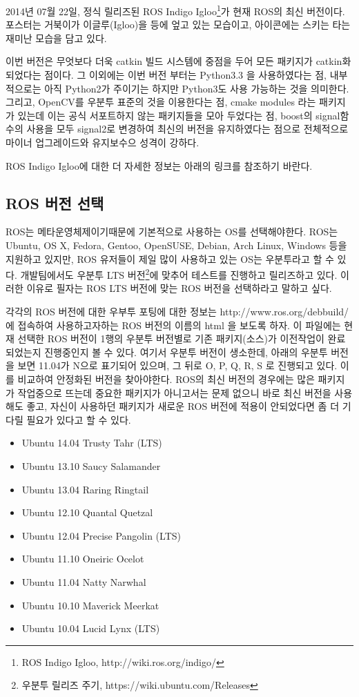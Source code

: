 2014년 07월 22일, 정식 릴리즈된 ROS Indigo Igloo\footnote{ROS Indigo Igloo, http://wiki.ros.org/indigo/}가 현재 ROS의 최신 버전이다. 포스터는 거북이가 이글루(Igloo)을 등에 엎고 있는 모습이고, 아이콘에는 스키는 타는 재미난 모습을 담고 있다.

이번 버전은 무엇보다 더욱 catkin 빌드 시스템에 중점을 두어 모든 패키지가 catkin화 되었다는 점이다. 그 이외에는 이번 버전 부터는 Python3.3 을 사용하였다는 점, 내부적으로는 아직 Python2가 주이기는 하지만 Python3도 사용 가능하는 것을 의미한다. 그리고, OpenCV를 우분투 표준의 것을 이용한다는 점, cmake modules 라는 패키지가 있는데 이는 공식 서포트하지 않는 패키지들을 모아 두었다는 점, boost의 signal함수의 사용을 모두 signal2로 변경하여 최신의 버전을 유지하였다는 점으로 전체적으로 마이너 업그레이드와 유지보수으 성격이 강하다.

ROS Indigo Igloo에 대한 더 자세한 정보는 아래의 링크를 참조하기 바란다.

\subsection{ROS 버전 선택}

ROS는 메타운영체제이기때문에 기본적으로 사용하는 OS를 선택해야한다. ROS는 Ubuntu, OS X, Fedora, Gentoo, OpenSUSE, Debian, Arch Linux, Windows 등을 지원하고 있지만, ROS 유저들이 제일 많이 사용하고 있는 OS는 우분투라고 할 수 있다. 개발팀에서도 우분투 LTS 버전\footnote{우분투 릴리즈 주기, https://wiki.ubuntu.com/Releases}에 맞추어 테스트를 진행하고 릴리즈하고 있다. 이러한 이유로 필자는 ROS LTS 버전에 맞는 ROS 버전을 선택하라고 말하고 싶다. 

각각의 ROS 버전에 대한 우부투 포팅에 대한 정보는 http://www.ros.org/debbuild/ 에 접속하여 사용하고자하는 ROS 버전의 이름의 html 을 보도록 하자. 이 파일에는 현재 선택한 ROS 버전이 1행의 우분투 버전별로 기존 패키지(소스)가 이전작업이 완료되었는지 진행중인지 볼 수 있다. 여기서 우분투 버전이 생소한데, 아래의 우분투 버전을 보면 11.04가 N으로 표기되어 있으며, 그 뒤로 O, P, Q, R, S 로 진행되고 있다. 이를 비교하여 안정화된 버전을 찾아야한다. ROS의 최신 버전의 경우에는 많은 패키지가 작업중으로 뜨는데 중요한 패키지가 아니고서는 문제 없으니 바로 최신 버전을 사용해도 좋고, 자신이 사용하던 패키지가 새로운 ROS 버전에 적용이 안되었다면 좀 더 기다릴 필요가 있다고 할 수 있다. 

\begin{itemize}
\item Ubuntu 14.04 Trusty Tahr (LTS)
\item Ubuntu 13.10 Saucy Salamander
\item Ubuntu 13.04 Raring Ringtail 
\item Ubuntu 12.10 Quantal Quetzal 
\item Ubuntu 12.04 Precise Pangolin (LTS)
\item Ubuntu 11.10 Oneiric Ocelot
\item Ubuntu 11.04 Natty Narwhal
\item Ubuntu 10.10 Maverick Meerkat
\item Ubuntu 10.04 Lucid Lynx (LTS)
\end{itemize}

